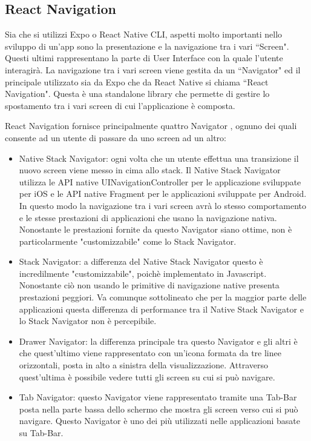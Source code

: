 \subsection{React Navigation}
Sia che si utilizzi Expo o React Native CLI, aspetti molto importanti nello sviluppo di un'app sono la presentazione e la navigazione tra i vari ``Screen". Questi ultimi
rappresentano la parte di User Interface con la quale l'utente interagir\`a. La navigazione tra i vari screen
viene gestita da un ``Navigator" ed il principale utilizzato sia da Expo che da React Native si chiama ``React Navigation".
Questa \`e una standalone library che permette di gestire lo spostamento tra i vari screen di cui l'applicazione \`e composta.

React Navigation fornisce principalmente quattro Navigator \cite{ReactNavigation}, ognuno dei quali consente ad un utente di passare da uno screen ad un altro:
\begin{itemize}
      \item Native Stack Navigator: ogni volta che un utente effettua una transizione
            il nuovo screen viene messo in cima allo stack. Il Native Stack Navigator utilizza le API native UINavigationController per le applicazione sviluppate per iOS e le API native Fragment per le
            applicazioni sviluppate per Android. \\In questo modo la navigazione tra i vari screen avr\`a lo stesso comportamento e le stesse prestazioni
            di applicazioni che usano la navigazione nativa. Nonostante le prestazioni fornite da questo Navigator siano ottime, non \`e particolarmente "customizzabile"
            come lo Stack Navigator.
      \item Stack Navigator: a differenza del Native Stack Navigator questo \`e incredilmente "customizzabile", poich\`e implementato in Javascript. Nonostante ci\`o non usando le primitive di navigazione native
            presenta prestazioni peggiori. Va comunque sottolineato che per la maggior parte delle applicazioni questa differenza di performance tra il Native Stack Navigator e lo Stack Navigator non \`e percepibile.
      \item Drawer Navigator: la differenza principale tra questo Navigator e gli altri \`e che quest'ultimo viene rappresentato con un'icona formata da tre linee orizzontali, posta in alto a sinistra della visualizzazione. Attraverso
            quest'ultima \`e possibile vedere tutti gli screen su cui si pu\`o navigare.
      \item Tab Navigator: questo Navigator viene rappresentato tramite una Tab-Bar posta nella parte bassa dello schermo che mostra gli screen verso cui si
            pu\`o navigare. Questo Navigator \`e uno dei pi\`u utilizzati nelle applicazioni basate su Tab-Bar.
\end{itemize}


